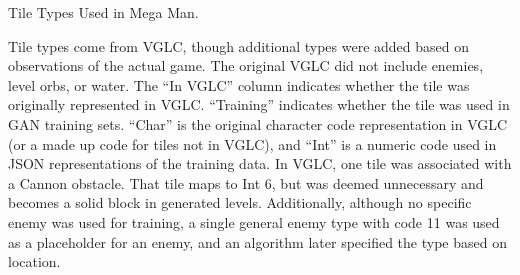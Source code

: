 \begin{table}[t!]
\caption{\label{tab:tiles}Tile Types Used in Mega Man.}
{\small Tile types come from VGLC, though additional types were added based on observations of the actual game. The original VGLC did not include enemies, level orbs, or water. The ``In VGLC'' column indicates whether the tile was originally represented in VGLC. ``Training'' indicates whether the tile was used in GAN training sets. ``Char'' is the original character code representation in VGLC (or a made up code for tiles not in VGLC), and ``Int'' is a numeric code used in JSON representations of the training data. In VGLC, one tile was associated with a Cannon obstacle. That tile maps to Int 6, but was deemed unnecessary and becomes a solid block in generated levels. Additionally, although no specific enemy was used for training, a single general enemy type with code 11 was used as a placeholder for an enemy, and an algorithm later specified the type based on location.}


\end{table}
